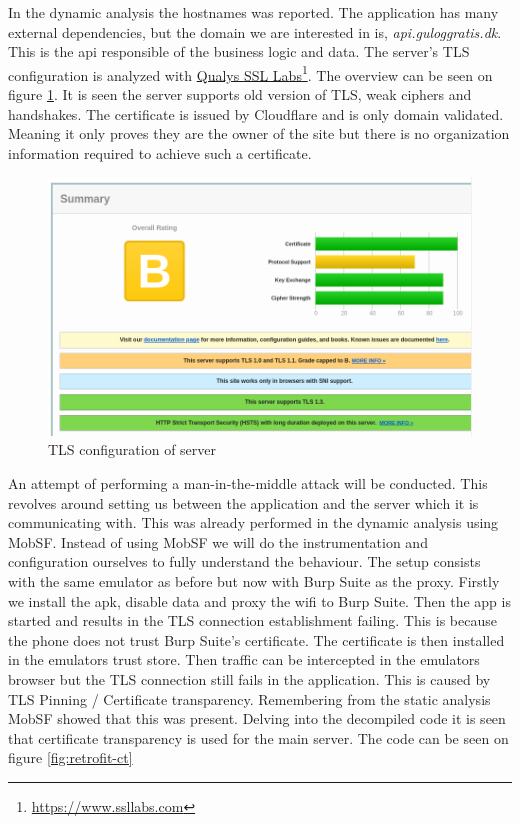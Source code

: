 In the dynamic analysis the hostnames was reported. The application has many external dependencies, but the domain we are interested in is, \textit{api.guloggratis.dk}. This is the api responsible of the business logic and data. The server's TLS configuration is analyzed with \href{https://www.ssllabs.com}{Qualys SSL Labs}\footnote{\href{https://www.ssllabs.com}{https://www.ssllabs.com}}. The overview can be seen on figure \ref{fig:sslreport-overview}. It is seen the server supports old version of TLS, weak ciphers and handshakes. The certificate is issued by Cloudflare and is only domain validated. Meaning it only proves they are the owner of the site but there is no organization information required to achieve such a certificate.  

\begin{figure}[htbp]
    \centering
    \includegraphics[width=1\columnwidth]{../static-analysis/pictures/sslreport_overview.png}
    \caption{TLS configuration of server}
    \label{fig:sslreport-overview}
\end{figure}

An attempt of performing a man-in-the-middle attack will be conducted. This revolves around setting us between the application and the server which it is communicating with. This was already performed in the dynamic analysis using MobSF. Instead of using MobSF we will do the instrumentation and configuration ourselves to fully understand the behaviour. The setup consists with the same emulator as before but now with Burp Suite as the proxy. Firstly we install the apk, disable data and proxy the wifi to Burp Suite. Then the app is started and results in the TLS connection establishment failing. This is because the phone does not trust Burp Suite's certificate. The certificate is then installed in the emulators trust store. Then traffic can be intercepted in the emulators browser but the TLS connection still fails in the application. This is caused by TLS Pinning / Certificate transparency. Remembering from the static analysis MobSF showed that this was present. Delving into the decompiled code it is seen that certificate transparency is used for the main server. The code can be seen on figure \ref{fig:retrofit-ct}

